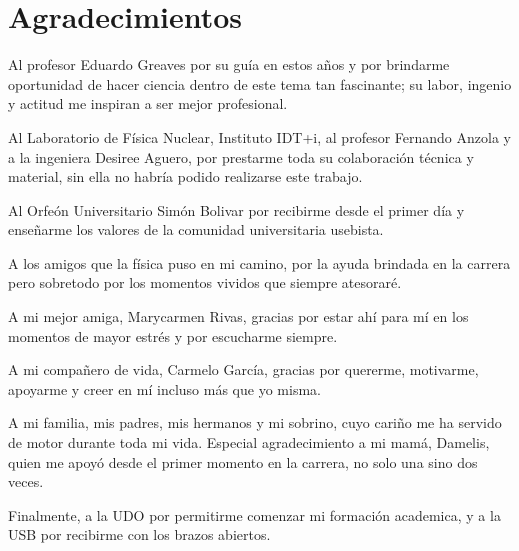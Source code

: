 \chapter*{Agradecimientos}


 Al profesor Eduardo Greaves por su guía en estos años y por brindarme oportunidad de hacer ciencia dentro de este tema tan fascinante; su labor, ingenio y actitud  me inspiran a ser mejor profesional.

 Al Laboratorio de Física Nuclear, Instituto IDT+i, al profesor Fernando Anzola y a la ingeniera Desiree Aguero, por prestarme toda su colaboración técnica y material, sin ella no habría podido realizarse este trabajo.

 Al Orfeón Universitario Simón Bolivar por recibirme desde el primer día y enseñarme los valores de la comunidad universitaria usebista.

 A los amigos que la física puso en mi camino, por la ayuda brindada en la carrera pero sobretodo por los momentos vividos que siempre atesoraré.

 A mi mejor amiga, Marycarmen Rivas, gracias por estar ahí para mí en los momentos de mayor estrés y por escucharme siempre.

 A mi compañero de vida, Carmelo García, gracias por quererme, motivarme, apoyarme y creer en mí incluso más que yo misma. 

 A mi familia, mis padres, mis hermanos y mi sobrino, cuyo cariño me ha servido de motor durante toda mi vida. Especial agradecimiento a mi mamá, Damelis, quien me apoyó desde el primer momento en la carrera, no solo una sino dos veces.

 Finalmente, a la UDO por permitirme comenzar mi formación academica, y a la USB por recibirme con los brazos abiertos.





